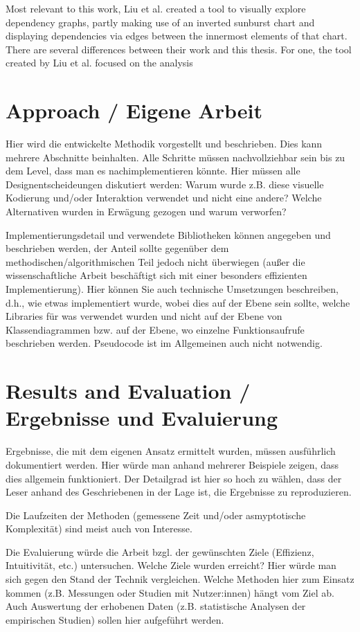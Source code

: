 \documentclass{article}
\begin{document}
Most relevant to this work, Liu et al. created a tool to visually explore dependency graphs, partly making use of an inverted sunburst chart and displaying dependencies via edges between the innermost elements of that chart. There are several differences between their work and this thesis. For one, the tool created by Liu et al. focused on the analysis



\section{Approach / Eigene Arbeit} 
Hier wird die entwickelte Methodik vorgestellt und beschrieben.
Dies kann mehrere Abschnitte beinhalten. Alle Schritte müssen nachvollziehbar sein bis zu dem Level, dass man es nachimplementieren könnte.
Hier müssen alle Designentscheideungen diskutiert werden: Warum wurde z.B. diese visuelle Kodierung und/oder Interaktion verwendet und nicht eine andere? Welche Alternativen wurden in Erwägung gezogen und warum verworfen?

Implementierungsdetail und verwendete Bibliotheken können angegeben und beschrieben werden, der Anteil sollte gegenüber dem methodischen/algorithmischen Teil jedoch nicht überwiegen 
(außer die wissenschaftliche Arbeit beschäftigt sich mit einer besonders effizienten Implementierung).
Hier können Sie auch technische Umsetzungen beschreiben, d.h., wie etwas implementiert wurde, wobei dies auf der Ebene sein sollte, welche Libraries für was verwendet wurden und nicht auf der Ebene von Klassendiagrammen bzw. auf der Ebene, wo einzelne Funktionsaufrufe beschrieben werden. Pseudocode ist im Allgemeinen auch nicht notwendig.


\section{Results and Evaluation / Ergebnisse und Evaluierung} Ergebnisse, die mit dem eigenen Ansatz ermittelt wurden, müssen ausführlich dokumentiert werden. Hier würde man anhand mehrerer Beispiele zeigen, dass dies allgemein funktioniert. Der Detailgrad ist hier so hoch zu wählen, dass der Leser anhand des Geschriebenen in der Lage ist, die Ergebnisse zu reproduzieren. 

Die Laufzeiten der Methoden (gemessene Zeit und/oder asmyptotische Komplexität) sind meist auch von Interesse.

Die Evaluierung würde die Arbeit bzgl. der gewünschten Ziele (Effizienz, Intuitivität, etc.) untersuchen. Welche Ziele wurden erreicht? Hier würde man sich gegen den Stand der Technik vergleichen. Welche Methoden hier zum Einsatz kommen (z.B. Messungen oder Studien mit Nutzer:innen) hängt vom Ziel ab. Auch Auswertung der erhobenen Daten (z.B. statistische Analysen der empirischen Studien) sollen hier aufgeführt werden.
\end{document}
